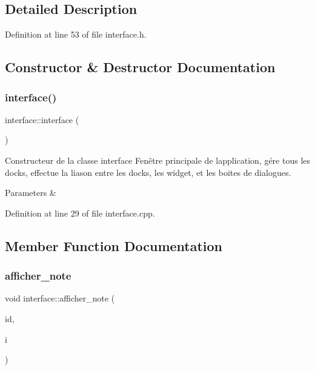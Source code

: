 \subsection{Detailed Description}


Definition at line 53 of file interface.\+h.



\subsection{Constructor \& Destructor Documentation}
\mbox{\label{classinterface_a13e0ee4b9df1714d747d62ec46220c55}} 
\subsubsection{\texorpdfstring{interface()}{interface()}}
{\footnotesize\ttfamily interface\+::interface (\begin{DoxyParamCaption}{ }\end{DoxyParamCaption})}



Constructeur de la classe interface Fenêtre principale de l\textquotesingle{}application, gére tous les docks, effectue la liason entre les docks, les widget, et les boites de dialogues. 


\begin{DoxyParams}{Parameters}
{\em } & \\
\hline
\end{DoxyParams}


Definition at line 29 of file interface.\+cpp.



\subsection{Member Function Documentation}
\mbox{\label{classinterface_a320051a7a36aa24f53b12df82649f15f}} 
\subsubsection{\texorpdfstring{afficher\+\_\+note}{afficher\_note}}
{\footnotesize\ttfamily void interface\+::afficher\+\_\+note (\begin{DoxyParamCaption}\item[{Q\+String}]{id,  }\item[{int}]{i }\end{DoxyParamCaption})\hspace{0.3cm}{\ttfamily [slot]}}



